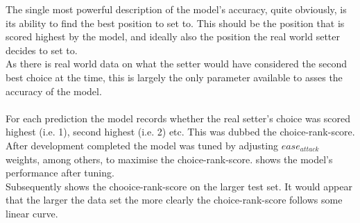 \documentclass[main.tex]{subfiles}
\begin{document}
        The single most powerful description of the model's accuracy, quite obviously, is its ability to find the best position to set to. This should be the position that is scored highest by the model, and ideally also the position the real world setter decides to set to.\\
        As there is real world data on what the setter would have considered the second best choice at the time, this is largely the only parameter available to asses the accuracy of the model.
        \\\\
        For each prediction the model records whether the real setter's choice was scored highest (i.e. 1), second highest (i.e. 2) etc. This was dubbed the choice-rank-score. \\
        After development completed the model was tuned by adjusting \(ease_{attack}\) weights, among others, to maximise the choice-rank-score.  shows the model's performance after tuning. \\
        Subsequently  shows the chooice-rank-score on the larger test set. It would appear that the larger the data set the more clearly the choice-rank-score follows some linear curve.
        \\\\
\end{document}
